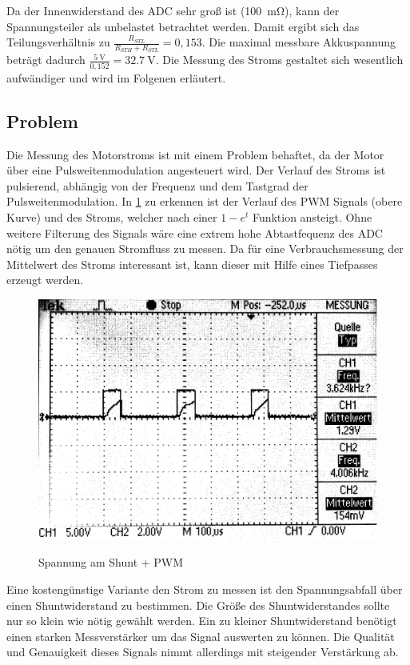 Da der Innenwiderstand des ADC sehr groß ist (\SI{100}{\mohm}), kann der Spannungsteiler als unbelastet betrachtet werden. Damit ergibt sich das Teilungsverhältnis zu $\frac{R_{STL}}{R_{STH}+R_{STL}}=0,153$.
Die maximal messbare Akkuspannung beträgt dadurch $\frac{\SI{5}{\V}}{0,152}=\SI{32,7}{\V}$. Die Messung des Stroms gestaltet sich wesentlich aufwändiger und wird im Folgenen erläutert.




\subsection{Problem}

Die Messung des Motorstroms ist mit einem Problem behaftet, da der Motor über eine Pulsweitenmodulation angesteuert wird. Der Verlauf des Stroms ist pulsierend, abhängig von
der Frequenz und dem Tastgrad der Pulsweitenmodulation. In \cref{fig:pwm+i_0} zu erkennen ist der Verlauf des PWM Signals (obere Kurve) und des Stroms, welcher nach einer $1-e^t$ Funktion ansteigt.
Ohne weitere Filterung des Signals wäre eine extrem hohe Abtastfequenz des ADC nötig um den genauen Stromfluss zu messen. Da für eine Verbrauchsmessung 
der Mittelwert des Stroms interessant ist, kann dieser mit Hilfe eines Tiefpasses erzeugt werden.


\begin{figure}[H]
\centering
\includegraphics[width=.8\textwidth]{oszi.png}\\
\caption{Spannung am Shunt + PWM}%
\label{fig:pwm+i_0}
\end{figure}

Eine kostengünstige Variante den Strom zu messen ist den Spannungsabfall über einen Shuntwiderstand zu bestimmen. Die Größe des Shuntwiderstandes sollte nur so klein wie nötig gewählt werden.
Ein zu kleiner Shuntwiderstand benötigt einen starken Messverstärker um das Signal auswerten zu können. Die Qualität und Genauigkeit dieses Signals nimmt allerdings mit steigender Verstärkung ab.

